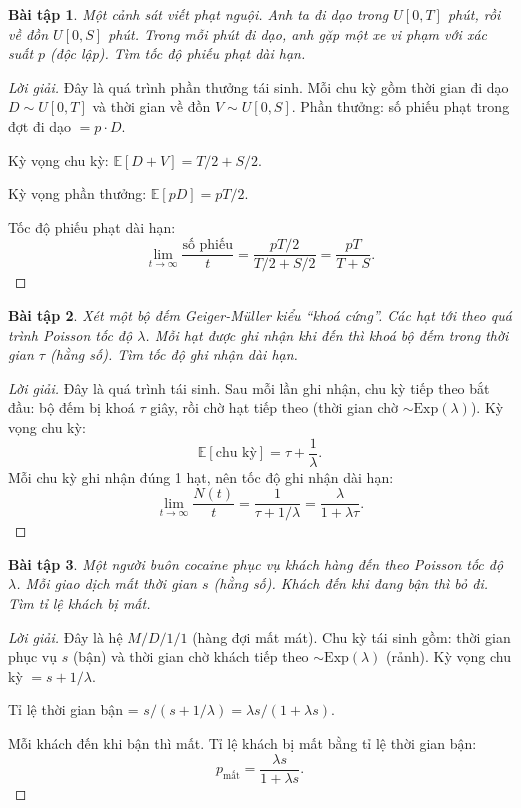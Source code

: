 \documentclass[8pt,a4paper]{article}
\newtheorem{exercise}{Bài tập}
\newenvironment{solution}{\begin{proof}[Lời giải]}{\end{proof}}
\newcommand{\E}{\mathbb{E}}
\begin{document}
\begin{exercise}
Một cảnh sát viết phạt nguội. Anh ta đi dạo trong $U[0, T]$ phút, rồi về đồn $U[0, S]$ phút. Trong mỗi phút đi dạo, anh gặp một xe vi phạm với xác suất $p$ (độc lập). Tìm tốc độ phiếu phạt dài hạn.
\end{exercise}
\begin{solution}
Đây là quá trình phần thưởng tái sinh. Mỗi chu kỳ gồm thời gian đi dạo $D \sim U[0,T]$ và thời gian về đồn $V \sim U[0,S]$. Phần thưởng: số phiếu phạt trong đợt đi dạo $= p \cdot D$.

Kỳ vọng chu kỳ: $\E[D+V] = T/2 + S/2$.

Kỳ vọng phần thưởng: $\E[pD] = pT/2$.

Tốc độ phiếu phạt dài hạn:
\[
  \lim_{t\to\infty} \frac{\text{số phiếu}}{t} = \frac{pT/2}{T/2 + S/2} = \frac{pT}{T+S}.
\]
\end{solution}

\begin{exercise}
Xét một bộ đếm Geiger-Müller kiểu ``khoá cứng''. Các hạt tới theo quá trình Poisson tốc độ $\lambda$. Mỗi hạt được ghi nhận khi đến thì khoá bộ đếm trong thời gian $\tau$ (hằng số). Tìm tốc độ ghi nhận dài hạn.
\end{exercise}
\begin{solution}
Đây là quá trình tái sinh. Sau mỗi lần ghi nhận, chu kỳ tiếp theo bắt đầu: bộ đếm bị khoá $\tau$ giây, rồi chờ hạt tiếp theo (thời gian chờ $\sim \text{Exp}(\lambda)$). Kỳ vọng chu kỳ:
\[
  \E[\text{chu kỳ}] = \tau + \frac{1}{\lambda}.
\]
Mỗi chu kỳ ghi nhận đúng 1 hạt, nên tốc độ ghi nhận dài hạn:
\[
  \lim_{t\to\infty} \frac{N(t)}{t} = \frac{1}{\tau + 1/\lambda} = \frac{\lambda}{1 + \lambda\tau}.
\]
\end{solution}

\begin{exercise}
Một người buôn cocaine phục vụ khách hàng đến theo Poisson tốc độ $\lambda$. Mỗi giao dịch mất thời gian $s$ (hằng số). Khách đến khi đang bận thì bỏ đi. Tìm tỉ lệ khách bị mất.
\end{exercise}
\begin{solution}
Đây là hệ $M/D/1/1$ (hàng đợi mất mát). Chu kỳ tái sinh gồm: thời gian phục vụ $s$ (bận) và thời gian chờ khách tiếp theo $\sim \text{Exp}(\lambda)$ (rảnh). Kỳ vọng chu kỳ $= s + 1/\lambda$.

Tỉ lệ thời gian bận = $s/(s + 1/\lambda) = \lambda s/(1+\lambda s)$.

Mỗi khách đến khi bận thì mất. Tỉ lệ khách bị mất bằng tỉ lệ thời gian bận:
\[
  p_{\text{mất}} = \frac{\lambda s}{1 + \lambda s}.
\]
\end{solution}
\end{document}
